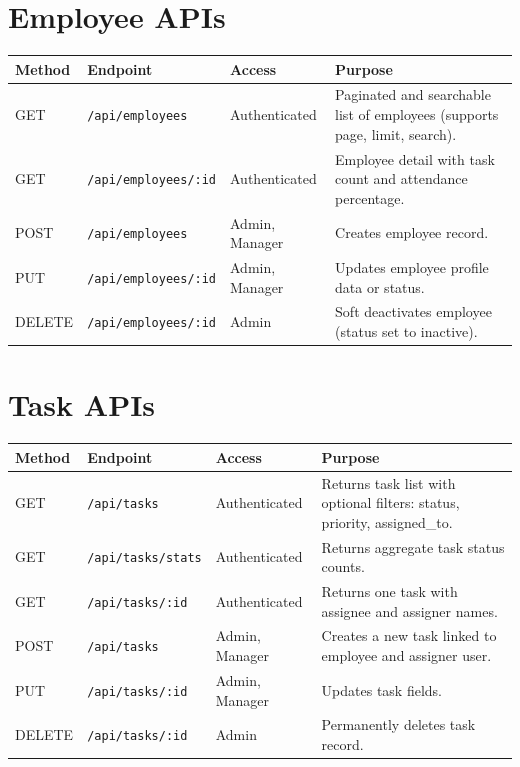 \section{Employee APIs}
\begin{longtable}{L{1.5cm}L{4.8cm}L{2.2cm}L{5.9cm}}
\toprule
\textbf{Method} & \textbf{Endpoint} & \textbf{Access} & \textbf{Purpose} \\
\midrule
\endhead
GET & \texttt{/api/employees} & Authenticated & Paginated and searchable list of employees (supports page, limit, search). \\
GET & \texttt{/api/employees/:id} & Authenticated & Employee detail with task count and attendance percentage. \\
POST & \texttt{/api/employees} & Admin, Manager & Creates employee record. \\
PUT & \texttt{/api/employees/:id} & Admin, Manager & Updates employee profile data or status. \\
DELETE & \texttt{/api/employees/:id} & Admin & Soft deactivates employee (status set to inactive). \\
\bottomrule
\end{longtable}

\section{Task APIs}
\begin{longtable}{L{1.5cm}L{4.8cm}L{2.2cm}L{5.9cm}}
\toprule
\textbf{Method} & \textbf{Endpoint} & \textbf{Access} & \textbf{Purpose} \\
\midrule
\endhead
GET & \texttt{/api/tasks} & Authenticated & Returns task list with optional filters: status, priority, assigned\_to. \\
GET & \texttt{/api/tasks/stats} & Authenticated & Returns aggregate task status counts. \\
GET & \texttt{/api/tasks/:id} & Authenticated & Returns one task with assignee and assigner names. \\
POST & \texttt{/api/tasks} & Admin, Manager & Creates a new task linked to employee and assigner user. \\
PUT & \texttt{/api/tasks/:id} & Admin, Manager & Updates task fields. \\
DELETE & \texttt{/api/tasks/:id} & Admin & Permanently deletes task record. \\
\bottomrule
\end{longtable}

